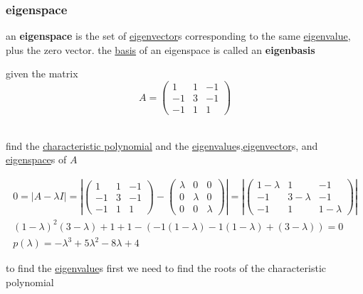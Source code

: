 \documentclass[a4paper,12pt]{article}
\begin{document}
\subsubsection{eigenspace}
\label{sec:org9b2c79c}
\begin{definition}
an \textbf{eigenspace} is the set of \hyperref[sec:org929d22f]{eigenvector}s corresponding to the same \hyperref[sec:org929d22f]{eigenvalue}, plus the zero vector. the \hyperref[sec:orgfcbaa89]{basis} of an eigenspace is called an \textbf{eigenbasis}\\

\begin{question}
given the matrix\\
\[
  A = \begin{pmatrix} 1 & 1 & -1\\ -1 & 3 & -1\\ -1 & 1 & 1 \end{pmatrix}
\]\\
\begin{subquestion}
find the \hyperref[sec:orgb773cc6]{characteristic polynomial} and the \hyperref[sec:org929d22f]{eigenvalue}s,\hyperref[sec:org929d22f]{eigenvector}s, and \hyperref[sec:org9b2c79c]{eigenspace}s of \(A\)\\
\begin{answer}
\begin{step}
\begin{gather*}
  0 = |A - \lambda I| = \left|\begin{pmatrix} 1 & 1 & -1\\ -1 & 3 & -1\\ -1 & 1 & 1 \end{pmatrix} - \begin{pmatrix} \lambda & 0 & 0\\ 0 & \lambda & 0\\ 0 & 0 & \lambda \end{pmatrix}\right| = \left|\begin{pmatrix} 1-\lambda & 1 & -1\\ -1 & 3-\lambda & -1\\ -1 & 1 & 1-\lambda \end{pmatrix}\right|\\
  {(1-\lambda)}^2(3-\lambda) + 1 + 1 - \left(-1(1-\lambda)-1(1-\lambda)+(3-\lambda)\right) = 0\\
  p(\lambda) = -\lambda^3 + 5\lambda^2 - 8\lambda + 4
\end{gather*}
\end{step}
\begin{step}
to find the \hyperref[sec:org929d22f]{eigenvalue}s first we need to find the roots of the characteristic polynomial\\


\end{step}
\end{answer}
\end{subquestion}
\end{question}
\end{definition}
\end{document}
